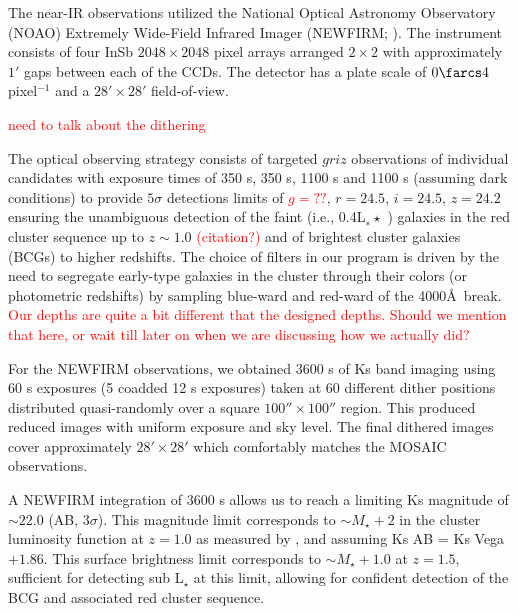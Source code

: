 \documentclass[apj, revtex4]{emulateapj}
\newcommand{\editorial}[1]{\textcolor{red}{#1}}
\begin{document}
The near-IR observations utilized the National Optical Astronomy Observatory (NOAO) Extremely Wide-Field Infrared Imager (NEWFIRM; \citealt{Probst2004}). The instrument consists of four InSb $2048 \times 2048$ pixel arrays arranged $2\times2$ with approximately $1'$ gaps between each of the CCDs. The detector has a plate scale of $0\farcs4$ pixel$^{-1}$ and a $28'\times28'$ field-of-view.

\editorial{need to talk about the dithering}

The optical observing strategy consists of targeted $griz$ observations of individual candidates with exposure times of 350 s, 350 s, 1100 s and 1100 s (assuming dark conditions) to provide $5\sigma$ detections limits of \editorial{$g=??$}, $r = 24.5$, $i = 24.5$, $z = 24.2$ ensuring the unambiguous detection of the faint (i.e., 0.4L$_∗\star$ ) galaxies in the red cluster sequence up to $z \sim 1.0$ \editorial{(citation?)} and of brightest cluster galaxies (BCGs) to higher redshifts. The choice of filters in our program is driven by the need to segregate early-type galaxies in the cluster through their colors (or photometric redshifts) by sampling blue-ward and red-ward of the 4000\AA\ break. \editorial{Our depths are quite a bit different that the designed depths. Should we mention that here, or wait till later on when we are discussing how we actually did?}

For the NEWFIRM observations, we obtained 3600 s of Ks band imaging using 60 s exposures (5 coadded 12 s exposures) taken at 60 different dither positions distributed quasi-randomly over a square $100''\times100''$ region. This produced reduced images with uniform exposure and sky level. The final dithered images cover approximately $28'\times28'$ which comfortably matches the MOSAIC observations.

A NEWFIRM integration of 3600 s allows us to reach a limiting Ks magnitude of $\sim 22.0$ (AB, $3\sigma$). This magnitude limit corresponds to $\sim M_{\star} + 2$ in the cluster luminosity function at $z = 1.0$ as measured by \cite{DePropris1999a}, and assuming Ks AB = Ks Vega $+ 1.86$. This surface brightness limit corresponds to $\sim M_{\star} + 1.0$ at $z = 1.5$, sufficient for detecting sub L$_{\star}$ at this limit, allowing for confident detection of the BCG and associated red cluster sequence.
\end{document}
